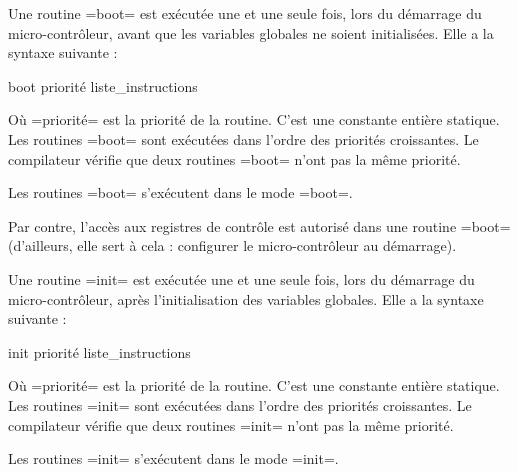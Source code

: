 
Une routine \omnibus=boot= est exécutée une et une seule fois, lors du démarrage du micro-contrôleur, avant que les variables globales ne soient initialisées. Elle a la syntaxe suivante :
\begin{OMNIBUS}
boot priorité {
  liste_instructions
}
\end{OMNIBUS}
Où \omnibus=priorité= est la priorité de la routine. C'est une constante entière statique. Les routines \omnibus=boot= sont exécutées dans l'ordre des priorités croissantes. Le compilateur vérifie que deux routines \omnibus=boot= n'ont pas la même priorité.

Les routines \omnibus=boot= s'exécutent dans le mode \omnibus=boot=.


Par contre, l'accès aux registres de contrôle est autorisé dans une routine \omnibus=boot= (d'ailleurs, elle sert à cela : configurer le micro-contrôleur au démarrage).








Une routine \omnibus=init= est exécutée une et une seule fois, lors du démarrage du micro-contrôleur, après l'initialisation des variables globales. Elle a la syntaxe suivante :
\begin{OMNIBUS}
init priorité {
  liste_instructions
}
\end{OMNIBUS}
Où \omnibus=priorité= est la priorité de la routine. C'est une constante entière statique. Les routines \omnibus=init= sont exécutées dans l'ordre des priorités croissantes. Le compilateur vérifie que deux routines \omnibus=init= n'ont pas la même priorité.

Les routines \omnibus=init= s'exécutent dans le mode \omnibus=init=.


















